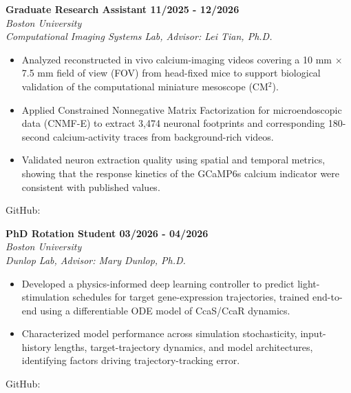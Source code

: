 \documentclass[letterpaper, 11pt]{article}
\newcommand{\subsectionvspace}{\vspace{8pt}}
\begin{document}
    \textbf{Graduate Research Assistant \hfill 11/2025 - 12/2026} \\
    \textit{Boston University} \\
    \textit{Computational Imaging Systems Lab, Advisor: Lei Tian, Ph.D.}
    \begin{itemize}
        \item Analyzed reconstructed in vivo calcium-imaging videos covering a 10 mm $\times$ 7.5 mm field of view (FOV) from head-fixed mice to support biological validation of the computational miniature mesoscope (CM$^{2}$).
        \item Applied Constrained Nonnegative Matrix Factorization for microendoscopic data (CNMF-E) to extract 3,474 neuronal footprints and corresponding 180-second calcium-activity traces from background-rich videos.
        \item Validated neuron extraction quality using spatial and temporal metrics, showing that the response kinetics of the GCaMP6s calcium indicator were consistent with published values.
    \end{itemize}
    GitHub: \href{https://github.com/tianrui-qi/CM2-NeuronalSignal}{}

    \subsectionvspace

    \textbf{PhD Rotation Student \hfill 03/2026 - 04/2026} \\
    \textit{Boston University} \\
    \textit{Dunlop Lab, Advisor: Mary Dunlop, Ph.D.}
    \begin{itemize}
        \item Developed a physics-informed deep learning controller to predict light-stimulation schedules for target gene-expression trajectories, trained end-to-end using a differentiable ODE model of CcaS/CcaR dynamics.
        \item Characterized model performance across simulation stochasticity, input-history lengths, target-trajectory dynamics, and model architectures, identifying factors driving trajectory-tracking error.
    \end{itemize}
    GitHub: \href{https://github.com/tianrui-qi/GEPC}{}

    \subsectionvspace
\end{document}
